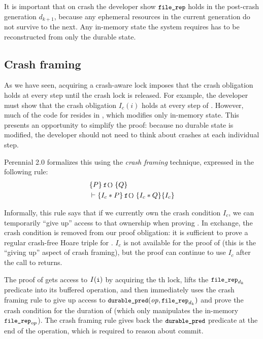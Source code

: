 It is important that on crash the developer show $\cc{file_rep}$ holds in the
post-crash generation $d_{k+1}$, because any ephemeral resources in the current
generation do not survive to the next. Any in-memory state the system requires
has to be reconstructed from only the durable state.



\subsection{Crash framing}
\label{s:design:crashframe}

As we have seen, acquiring a crash-aware lock imposes that the crash obligation holds at
every step until the crash lock is released.  For example, the developer must
show that the crash obligation $I_c(i)$
holds at every step of .  However, much of the
code for  resides in ,
which modifies only in-memory state.  This presents an opportunity to
simplify the proof: because no durable state is modified, the developer
should not need to think about crashes at each individual step.

Perennial 2.0 formalizes this using the \emph{crash framing} technique, expressed in the
following rule:
%
\begin{align*}
&\hoare{P}{\cc{f()}}{Q} \\
&\vdash \hoareC{I_c\sep P}{\cc{f()}}{I_c\sep Q}{I_c}
\end{align*}

Informally, this rule says that if we currently own the crash condition $I_c$, we can temporarily ``give up'' access to that ownership when proving .
In exchange, the crash condition is removed from our proof obligation: it is sufficient to prove a regular crash-free Hoare triple for .
$I_c$ is not available for the proof of  (this is the ``giving up'' aspect of crash framing),
but the proof can continue to use $I_{c}$ after the call to  returns.

The proof of  gets access to $I(\cc{i})$ by acquiring the
th lock, lifts the $\cc{file_rep}_{d_k}$ predicate into its buffered operation,
and then immediately uses the crash framing rule to give up access to
$\bufobjDurable(\mathit{op}, \cc{file_rep}_{d_k})$ and prove the crash condition for the
duration of  (which only manipulates the in-memory
$\cc{file_rep}_{op}$). The crash framing rule gives back the
$\bufobjDurable$ predicate at the end of the operation,
which is required to reason about commit.

